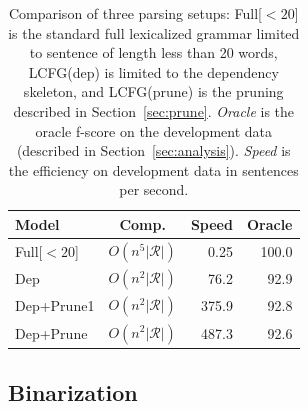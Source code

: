 \documentclass[11pt,letterpaper]{article}
\newcommand{\rules}{\mathcal{R}}
\begin{document}






\begin{table}
  \centering
  \small
  \hspace*{-0.3cm}
  \begin{tabular}{|l|crr|}
    \hline
    Model & Comp. & Speed & Oracle  \\
    \hline
    \hline
    Full[$< 20$]   & $O(n^5|\rules|)$ &     0.25 & 100.0  \\
    Dep    & $O(n^2|\rules|)$ &  76.2 & 92.9    \\
    Dep+Prune1    &  $O(n^2|\rules|)$ &  375.9 & 92.8    \\
    Dep+Prune  &   $O(n^2|\rules|)$ &   487.3 & 92.6 \\
    \hline
  \end{tabular}
  \label{tab:alg-oracle}
  \caption{Comparison of three parsing setups:
    Full[$<20$] is the standard full lexicalized grammar limited to sentence of length
    less than 20 words, LCFG(dep) is
    limited to the dependency skeleton, and LCFG(prune) is the pruning described in
    Section~\ref{sec:prune}. \textit{Oracle} is the oracle f-score on the development data (described in Section~\ref{sec:analysis}). \textit{Speed} is the efficiency  on development data in sentences per second.}
\end{table}

\subsection{Binarization}

\end{document}
